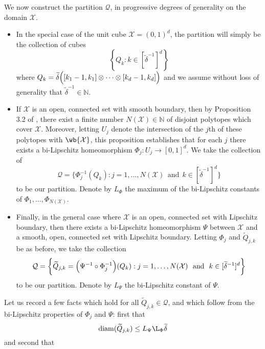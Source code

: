\documentclass[twoside]{article}
\newcommand{\set}[1]{\left\{#1\right\}}
\newcommand{\diam}{\mathrm{diam}}
\newcommand{\1}{\mathbf{1}}
\newcommand{\Xset}{\mathcal{X}}
\newcommand{\mc}[1]{\mathcal{#1}}
\newcommand{\wt}[1]{\widetilde{#1}}
\theoremstyle{definition}
\theoremstyle{remark}
\begin{document}
We now construct the partition $\mc{Q}$, in progressive degrees of generality on the domain $\Xset.$
\begin{itemize}
	\item In the special case of the unit cube $\Xset = (0,1)^d$, the partition will simply be the collection of cubes
	\begin{equation*}
	\set{Q_k: k \in [\wt{\delta}^{-1}]^d} 
	\end{equation*}
	where $Q_k = \wt{\delta}\Bigl([k_1 - 1,k_1] \otimes \cdots \otimes [k_d - 1,k_d]\Bigr)$ and we assume without loss of generality that $\wt{\delta}^{-1} \in \mathbb{N}$.
	\item If $\mc{\Xset}$ is an open, connected set with smooth boundary, then by Proposition 3.2 of \citet{trillos2015}, there exist a finite number $N(\Xset) \in \mathbb{N}$ of disjoint polytopes which cover $\Xset$. Moreover, letting $U_j$ denote the intersection of the $j$th of these polytopes with $\wb{\Xset}$, this proposition establishes that for each $j$ there exists a bi-Lipschitz homeomorphism $\Phi_j: U_j \to [0,1]^d$. We take the collection of
	\begin{equation*}
	\mc{Q} = \biggl\{\Phi_j^{-1}(Q_k): j = 1,\ldots,N(\Xset)~~\textrm{and}~~k \in [\wt{\delta}^{-1}]^d\biggr\}
	\end{equation*}
	to be our partition. Denote by $L_{\Phi}$ the maximum of the bi-Lipschitz constants of $\Phi_1,\ldots,\Phi_{N(\Xset)}$.
	\item Finally, in the general case where $\Xset$ is an open, connected set with Lipschitz boundary, then there exists a bi-Lipschitz homeomorphism $\Psi$ between $\Xset$ and a smooth, open, connected set with Lipschitz boundary. Letting $\Phi_j$ and $\wt{Q}_{j,k}$ be as before, we take the collection
	\begin{equation*}
	\mc{Q} = \biggl\{\wt{Q}_{j,k} = \Bigl(\Psi^{-1} \circ \Phi_j^{-1}\Bigr)(Q_k): j = 1,\ldots,N(\Xset)~~\textrm{and}~~k \in [\wt{\delta}^{-1}]^d\biggr\}
	\end{equation*}
	to be our partition. Denote by $L_{\Psi}$ the bi-Lipschitz constant of $\Psi$.
\end{itemize}
Let us record a few facts which hold for all $\wt{Q}_{j,k} \in \mc{Q}$, and which follow from the bi-Lipschitz properties of $\Phi_j$ and $\Psi$: first that
\begin{equation}
\label{pf:prop_optimal_transport_1}
\diam(\wt{Q}_{j,k}) \leq L_{\Psi} \L_{\Phi} \wt{\delta}
\end{equation}
and second that
\end{document}
